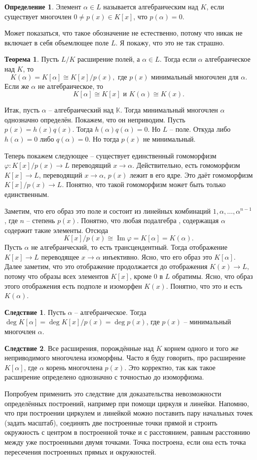 \documentclass[10pt,a4paper,oneside]{book}
\theoremstyle{definition}
\newtheorem*{defn}{{\color{yellow!30!red} Определение}}
\newtheorem{thm}{{\color{red!40!black} Теорема}}
\newtheorem{cor}{Следствие}
\newcommand{\mb}[1]{\mathbb{#1}}
\newcommand{\im}{\operatorname{Im}}
\def\ffi{\varphi}
\def\thrm{\begin{thm}}
\def\ethrm{\end{thm}}
\def\dfn{\begin{defn}}
\def\edfn{\end{defn}}
\def\crl{\begin{cor}}
\def\ecrl{\end{cor}}
\begin{document}
\dfn Элемент $\alpha \in L$ называется алгебраическим над $K$, если существует многочлен $0\neq p(x)\in K[x]$, что $p(\alpha)=0$. 
\edfn

Может показаться, что такое обозначение не естественно, потому что никак не включает в себя объемлющее поле $L$. Я покажу, что это не так страшно.


\thrm Пусть $L/K$ расширение полей, а $\alpha \in L$. Тогда если $\alpha$ алгебраическое над $K$, то $$K(\alpha)=K[\alpha]\cong K[x]/p(x),  \text{ где $p(x)$ минимальный многочлен для $\alpha$}.$$
Если же $\alpha$ не алгебраическое, то $$K[\alpha]\cong K[x] \text{ и } K(\alpha) \cong K(x).$$
\ethrm
\proof Итак, пусть $\alpha$ -- алгебраический над $\mb K$. Тогда минимальный многочлен $\alpha$ однозначно определён. Покажем, что он неприводим. Пусть $p(x)=h(x)q(x)$. Тогда $h(\alpha)q(\alpha)=0$. Но $L$ -- поле. Откуда либо $h(\alpha)=0$ либо $q(\alpha)=0$. Но тогда $p(x)$ не минимальный.

Теперь покажем следующее -- существует единственный гомоморфизм $\ffi \colon K[x]/p(x) \to L$ переводящий $x \to \alpha$. Действительно, есть гомоморфизм $K[x]\to L$, переводящий $x\to \alpha$, $p(x)$ лежит в его ядре. Это даёт гомоморфизм $K[x]/p(x) \to L$. 
Понятно, что такой гомоморфизм может быть только единственным.

Заметим, что его образ это поле и состоит из линейных комбинаций $1,\alpha,\dots,\alpha^{n-1}$, где $n$ -- степень $p(x)$. Понятно, что любая подалгебра , содержащая $\alpha$ содержит такие элементы. Отсюда $$K[x]/p(x) \cong \im \ffi = K[\alpha]=K(\alpha).$$
Пусть $\alpha$ не алгебраический, то есть трансцендентный. Тогда отображение $K[x] \to L$ переводящее $x\to\alpha$ инъективно. Ясно, что его образ это $K[\alpha]$. Далее заметим, что это отображение продолжается до отображения $K(x) \to L$, потому что образы всех элементов $K[x]$, кроме 0 в $L$ обратимы. Ясно, что образ этого отображения есть подполе и изоморфен $K(x)$. Понятно, что это и есть $K(\alpha)$.   
\endproof

\crl Пусть $\alpha$ -- алгебраическое. Тогда $\deg K[\alpha]= \deg K[x]/p(x)= \deg p(x)$, где $p(x)$ -- минимальный многочлен $\alpha$.
\ecrl

\crl Все расширения, порождённые над $K$ корнем одного и того же неприводимого многочлена изоморфны. Часто я буду говорить, про расширение $K[\alpha]$, где $\alpha$ корень многочлена $p(x)$. Это корректно, так как такое расширение определено однозначно с точностью до изоморфизма.
\ecrl

Попробуем применить это следствие для доказательства невозможности определённых  построений, например при помощи циркуля и линейки. Напомню, что при построении циркулем и линейкой можно поставить пару начальных точек (задать масштаб), соединять две построенные  точки прямой и строить окружность с центром в построенной точке и с расстоянием, равным расстоянию между уже построенными двумя точками. Точка построена, если она есть точка пересечения построенных прямых и окружностей. 
\end{document}
